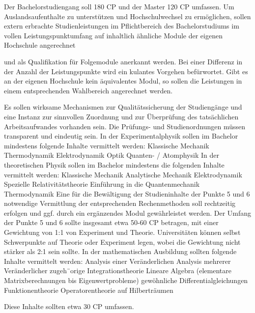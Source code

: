         Der Bachelorstudiengang soll 180 CP und der Master 120 CP umfassen.
        Um Auslandsaufenthalte zu unterstützen und Hochschulwechsel zu ermöglichen, sollen extern erbrachte Studienleistungen im Pflichtbereich des Bachelorstudiums im vollen Leistungspunktumfang auf inhaltlich ähnliche Module der eigenen Hochschule angerechnet

    und als Qualifikation für Folgemodule anerkannt werden. Bei einer Differenz in der Anzahl der Leistungspunkte wird ein kulantes Vorgehen befürwortet. Gibt es an der eigenen Hochschule kein äquivalentes Modul, so sollen die Leistungen in einem entsprechenden Wahlbereich angerechnet werden.

        Es sollen wirksame Mechanismen zur Qualitätssicherung der Studiengänge und eine Instanz zur sinnvollen Zuordnung und zur Überprüfung des tatsächlichen Arbeitsaufwandes vorhanden sein.
        Die Prüfungs- und Studienordnungen müssen transparent und eindeutig sein.
        In der Experimentalphysik sollen im Bachelor mindestens folgende Inhalte vermittelt werden:
            Klassische Mechanik
            Thermodynamik
            Elektrodynamik
            Optik
            Quanten- / Atomphysik
        In der theoretischen Physik sollen im Bachelor mindestens die folgenden Inhalte vermittelt werden:
            Klassische Mechanik
            Analytische Mechanik
            Elektrodynamik
            Spezielle Relativitätstheorie
            Einführung in die Quantenmechanik
            Thermodynamik
        Eine für die Bewältigung der Studieninhalte der Punkte 5 und 6 notwendige Vermittlung der entsprechenden Rechenmethoden soll rechtzeitig erfolgen und ggf. durch ein ergänzendes Modul gewährleistet werden.
        Der Umfang der Punkte 5 und 6 sollte insgesamt etwa 50-60 CP betragen, mit einer Gewichtung von 1:1 von Experiment und Theorie. Universitäten können selbst Schwerpunkte auf Theorie oder Experiment legen, wobei die Gewichtung nicht stärker als 2:1 sein sollte.
        In der mathematischen Ausbildung sollten folgende Inhalte vermittelt werden:
            Analysis einer Veränderlichen
            Analysis mehrerer Veränderlicher
            zugeh¨orige Integrationstheorie
            Lineare Algebra (elementare Matrixberechnungen bis Eigenwertprobleme)
            gewöhnliche Differentialgleichungen
            Funktionentheorie
            Operatorentheorie auf Hilberträumen

            Diese Inhalte sollten etwa 30 CP umfassen.

